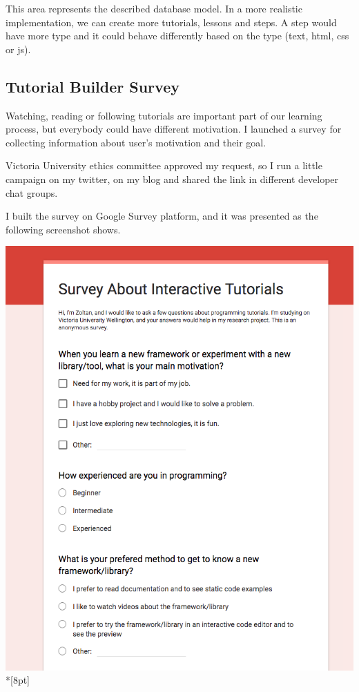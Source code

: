 \documentclass[12pt, a4paper, oneside, openright, medskipamount]{report}
\begin{document}
This area represents the described database model. In a more realistic implementation, we can create more tutorials, lessons and steps. A step would have more type and it could behave differently based on the type (text, html, css or js).

\newpage

\subsection{Tutorial Builder Survey}

Watching, reading or following tutorials are important part of our learning process, but everybody could have different motivation. I launched a survey for collecting information about user's motivation and their goal.

Victoria University ethics committee approved my request, so I run a little campaign on my twitter, on my blog and shared the link in different developer chat groups.

I built the survey on Google Survey platform, and it was presented as the following screenshot shows.

\includegraphics[width=1\textwidth]{assets/survey-screenshot.png}\\*[8pt]
\end{document}
